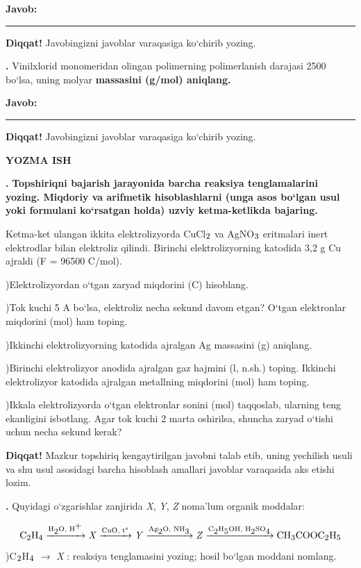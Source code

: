 \documentclass[11pt,a4paper]{article}
\renewcommand{\textsubscript}[1]{\ensuremath{_{\text{\fontsize{8}{8}\selectfont #1}}}}
\renewcommand{\textsuperscript}[1]{\ensuremath{^{\text{\fontsize{8}{8}\selectfont #1}}}}
\newcommand{\qn}[1]{\textbf{\fontsize{11.5}{13}\selectfont #1}}
\newcommand{\qsep}{\par\vspace{1pt}\noindent\rule{0pt}{0.4pt}\par\vspace{5pt}}
\newcommand{\diqqat}[1]{\par\smallskip\noindent\textbf{Diqqat!} #1\par\medskip}
\newcommand{\javob}{\par\smallskip\noindent\textbf{Javob:} \rule[-2pt]{7.5cm}{0.4pt}\par\smallskip\noindent\textbf{Diqqat!} Javobingizni javoblar varaqasiga ko`chirib yozing.\par\medskip}
\begin{document}
\javob\qsep
\noindent\qn{40.} Vinilxlorid monomeridan olingan polimerning polimerlanish darajasi 2500 bo`lsa, uning molyar \textbf{massasini (g/mol) aniqlang.}
\javob\qsep
\par\bigskip\begin{center}\textbf{\fontsize{13}{15}\selectfont YOZMA ISH}\end{center}
\noindent\qn{41.} \textbf{Topshiriqni bajarish jarayonida barcha reaksiya tenglamalarini yozing. Miqdoriy va arifmetik hisoblashlarni (unga asos bo`lgan usul yoki formulani ko`rsatgan holda) uzviy ketma-ketlikda bajaring.}\par\smallskip
Ketma-ket ulangan ikkita elektrolizyorda CuCl\textsubscript{2} va AgNO\textsubscript{3} eritmalari inert elektrodlar bilan elektroliz qilindi. Birinchi elektrolizyorning katodida 3,2 g Cu ajraldi (F = 96500 C/mol).\par
{})Elektrolizyordan o`tgan zaryad miqdorini (C) hisoblang.\par
{})Tok kuchi 5 A bo`lsa, elektroliz necha sekund davom etgan? O`tgan elektronlar miqdorini (mol) ham toping.\par
{})Ikkinchi elektrolizyorning katodida ajralgan Ag massasini (g) aniqlang.\par
{})Birinchi elektrolizyor anodida ajralgan gaz hajmini (l, n.sh.) toping. Ikkinchi elektrolizyor katodida ajralgan metallning miqdorini (mol) ham toping.\par
{})Ikkala elektrolizyorda o`tgan elektronlar sonini (mol) taqqoslab, ularning teng ekanligini isbotlang. Agar tok kuchi 2 marta oshirilsa, shuncha zaryad o`tishi uchun necha sekund kerak?\par
\diqqat{Mazkur topshiriq kengaytirilgan javobni talab etib, uning yechilish usuli va shu usul asosidagi barcha hisoblash amallari javoblar varaqasida aks etishi lozim.}\qsep
\noindent\qn{42.} Quyidagi o`zgarishlar zanjirida \textit{X}, \textit{Y}, \textit{Z} noma'lum organik moddalar:\par
\[\setlength{\fboxsep}{0pt}\text{C\textsubscript{2}H\textsubscript{4}}\xrightarrow{\text{H\textsubscript{2}O, H\textsuperscript{+}}}\text{\textit{X}}\xrightarrow{\text{CuO, t\textdegree{}}}\text{\textit{Y}}\xrightarrow{\text{Ag\textsubscript{2}O, NH\textsubscript{3}}}\text{\textit{Z}}\xrightarrow{\text{C\textsubscript{2}H\textsubscript{5}OH, H\textsubscript{2}SO\textsubscript{4}}}\text{CH\textsubscript{3}COOC\textsubscript{2}H\textsubscript{5}}\]
)C\textsubscript{2}H\textsubscript{4} $\to$ \textit{X} : reaksiya tenglamasini yozing; hosil bo`lgan moddani nomlang.\par
\end{document}
